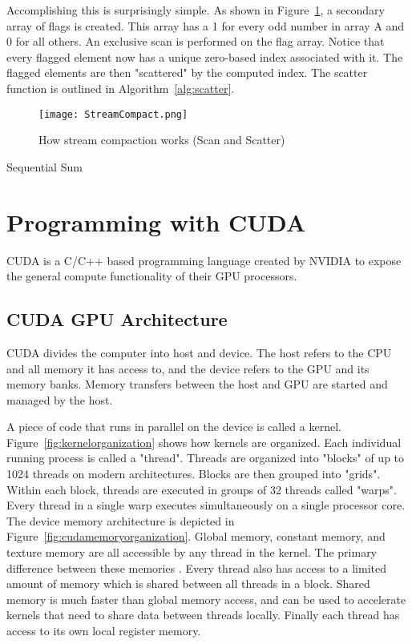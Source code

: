 Accomplishing this is surprisingly simple. As shown in Figure~\ref{fig:streamcompact}, a secondary array of flags is created. This array has a 1 for every odd number in array A and 0 for all others. An exclusive scan is performed on the flag array. Notice that every flagged element now has a unique zero-based index associated with it. The flagged elements are then "scattered" by the computed index. The scatter function is outlined in Algorithm~\ref{alg:scatter}.

\begin{figure}[h]
    \centering
    \texttt{[image: StreamCompact.png]}
    \caption{How stream compaction works (Scan and Scatter)}
    \label{fig:streamcompact}
\end{figure}


\begin{algorithm}[H]
\label{alg:scatter}
 \singlespacing
 \caption{Sequential Sum}
\end{algorithm}

\section{Programming with CUDA}
CUDA is a C/C++ based programming language created by NVIDIA to expose the general compute functionality of their GPU processors. 
\subsection{CUDA GPU Architecture}
CUDA divides the computer into host and device. The host refers to the CPU and all memory it has access to, and the device refers to the GPU and its memory banks. Memory transfers between the host and GPU are started and managed by the host.\par
A piece of code that runs in parallel on the device is called a kernel. Figure~\ref{fig:kernelorganization} shows how kernels are organized. Each individual running process is called a "thread". Threads are organized into "blocks" of up to 1024 threads on modern architectures. Blocks are then grouped into "grids". Within each block, threads are executed in groups of 32 threads called "warps". Every thread in a single warp executes simultaneously on a single processor core.
The device memory architecture is depicted in Figure~\ref{fig:cudamemoryorganization}. Global memory, constant memory, and texture memory are all accessible by any thread in the kernel. The primary difference between these memories . Every thread also has access to a limited amount of memory which is shared between all threads in a block. Shared memory is much faster than global memory access, and can be used to accelerate kernels that need to share data between threads locally. Finally each thread has access to its own local register memory.

